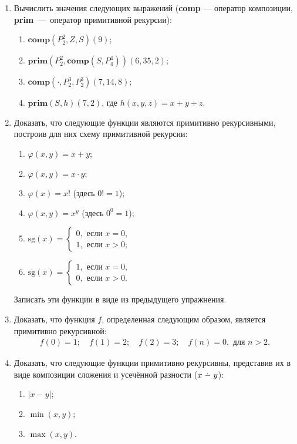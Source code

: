 \documentclass[12pt,a4paper]{article}
\newcommand{\monus}{\stackrel{{}^{\scriptstyle .}}{\smash{-}}}
\newcommand{\recop}[2]{\textbf{#1}(#2)}
\newcommand{\Comp}[1]{\recop{comp}{#1}}
\newcommand{\Prr}[1]{\recop{prim}{#1}}
\begin{document}
\begin{enumerate}[itemsep=3pt]
\item Вычислить значения следующих выражений (\textbf{comp} --- оператор композиции, \textbf{prim}~---~оператор примитивной рекурсии):
  \begin{multicols}{2}
    \begin{enumerate}
    \item $\Comp{P^2_2, Z,S}(9)$;
    \item $\Prr{P^2_2,\Comp{S, P^4_4}}(6,35,2)$;
    \item $\Comp{\cdot, P^3_2,P^3_2}(7, 14, 8)$;
    \item $\Prr{S,h}(7,2)$, где $h(x,y,z) = x+y+z$.
    \end{enumerate}
  \end{multicols}
\item Доказать, что следующие функции являются примитивно рекурсивными, построив для них
схему примитивной рекурсии:
  \begin{multicols}{2}
    \begin{enumerate}
    \item $\varphi(x,y)=x + y$;
    \item $\varphi(x,y)=x\cdot y$;
    \item $\varphi(x)=x!$ (здесь $0!=1$);
    \item $\varphi(x,y)=x^y$ (здесь $0^0=1$);
    \item $\mathrm{sg}(x)=\begin{cases}0, \mbox{ если }x=0,\\ 1,
        \mbox{ если }x>0;\end{cases}$
    \item $\overline{\mathrm{sg}}(x)=\begin{cases}1, \mbox{ если
        }x=0,\\ 0, \mbox{ если }x>0.\end{cases}$
    \end{enumerate}
  \end{multicols}
Записать эти функции в виде из предыдущего упражнения.

\item Доказать, что функция $f$, определенная следующим образом, является примитивно рекурсивной:
\[
\begin{array}{l}
f(0)=1;\quad f(1)=2;\quad  f(2)=3;\quad f(n)=0, \mbox{\ для $n>2$}.
\end{array}
\]
\item Доказать, что следующие функции примитивно рекурсивны, представив их в виде композиции
  сложения и усечённой разности ($x\monus y$):
  \begin{multicols}{3}
    \begin{enumerate}
    \item $|x-y|$;
    \item $\min(x,y)$;
    \item $\max(x,y)$.
    \end{enumerate}
  \end{multicols}




\end{enumerate}
\end{document}
